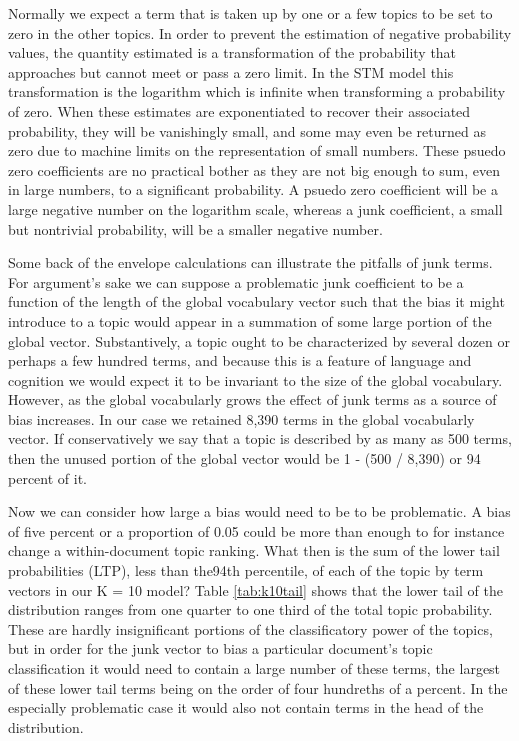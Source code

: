 \documentclass[]{book}
\theoremstyle{definition}
\theoremstyle{definition}
\theoremstyle{definition}
\theoremstyle{remark}
\begin{document}
Normally we expect a term that is taken up by one or a few topics to be
set to zero in the other topics. In order to prevent the estimation of
negative probability values, the quantity estimated is a transformation
of the probability that approaches but cannot meet or pass a zero limit.
In the STM model this transformation is the logarithm which is infinite
when transforming a probability of zero. When these estimates are
exponentiated to recover their associated probability, they will be
vanishingly small, and some may even be returned as zero due to machine
limits on the representation of small numbers. These psuedo zero
coefficients are no practical bother as they are not big enough to sum,
even in large numbers, to a significant probability. A psuedo zero
coefficient will be a large negative number on the logarithm scale,
whereas a junk coefficient, a small but nontrivial probability, will be
a smaller negative number.

Some back of the envelope calculations can illustrate the pitfalls of
junk terms. For argument's sake we can suppose a problematic junk
coefficient to be a function of the length of the global vocabulary
vector such that the bias it might introduce to a topic would appear in
a summation of some large portion of the global vector. Substantively, a
topic ought to be characterized by several dozen or perhaps a few
hundred terms, and because this is a feature of language and cognition
we would expect it to be invariant to the size of the global vocabulary.
However, as the global vocabularly grows the effect of junk terms as a
source of bias increases. In our case we retained 8,390 terms in the
global vocabularly vector. If conservatively we say that a topic is
described by as many as 500 terms, then the unused portion of the global
vector would be 1 - (500 / 8,390) or 94 percent of it.

Now we can consider how large a bias would need to be to be problematic.
A bias of five percent or a proportion of 0.05 could be more than enough
to for instance change a within-document topic ranking. What then is the
sum of the lower tail probabilities (LTP), less than the94th percentile,
of each of the topic by term vectors in our K = 10 model? Table
\ref{tab:k10tail} shows that the lower tail of the distribution ranges
from one quarter to one third of the total topic probability. These are
hardly insignificant portions of the classificatory power of the topics,
but in order for the junk vector to bias a particular document's topic
classification it would need to contain a large number of these terms,
the largest of these lower tail terms being on the order of four
hundreths of a percent. In the especially problematic case it would also
not contain terms in the head of the distribution.
\end{document}
